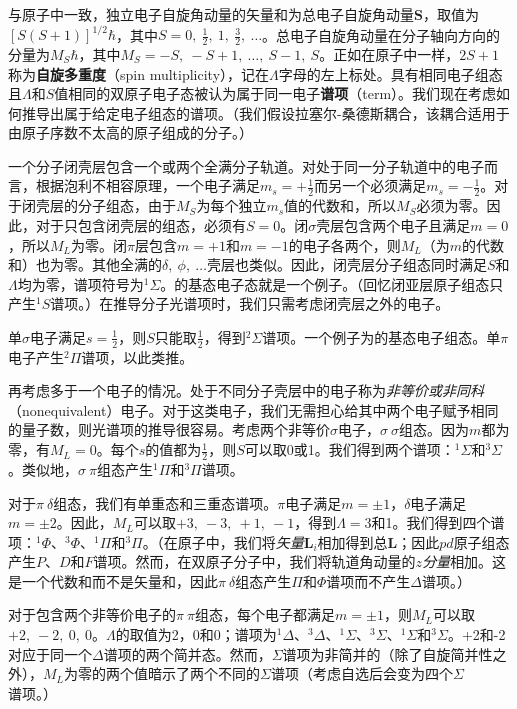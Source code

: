    与原子中一致，独立电子自旋角动量的矢量和为总电子自旋角动量$\mathbf{S}$，取值为$\left[S\left(S+1\right)\right]^{1/2}\hbar$，其中$S = 0,\:\frac{1}{2},\:1,\:\frac{3}{2},\:\ldots$。总电子自旋角动量在分子轴向方向的分量为$M_S\hbar$，其中$M_S = -S,\:-S+1,\:\ldots,\:S-1,\:S$。正如在原子中一样，$2S+1$称为\textbf{自旋多重度}（spin multiplicity），记在$\Lambda$字母的左上标处。具有相同电子组态且$\Lambda$和$S$值相同的双原子电子态被认为属于同一电子\textbf{谱项}（term）。我们现在考虑如何推导出属于给定电子组态的谱项。（我们假设拉塞尔-桑德斯耦合，该耦合适用于由原子序数不太高的原子组成的分子。）

    一个分子闭壳层包含一个或两个全满分子轨道。对处于同一分子轨道中的电子而言，根据泡利不相容原理，一个电子满足$m_s = +\frac{1}{2}$而另一个必须满足$m_s = -\frac{1}{2}$。对于闭壳层的分子组态，由于$M_S$为每个独立$m_s$值的代数和，所以$M_S$必须为零。因此，对于只包含闭壳层的组态，必须有$S=0$。闭$\sigma$壳层包含两个电子且满足$m=0$，所以$M_L$为零。闭$\pi$层包含$m=+1$和$m=-1$的电子各两个，则$M_L$（为$m$的代数和）也为零。其他全满的$\delta,\:\phi,\:\ldots$壳层也类似。因此，闭壳层分子组态同时满足$S$和$\Lambda$均为零，谱项符号为$^1\Sigma$。的基态电子态就是一个例子。（回忆闭亚层原子组态只产生$^1S$谱项。）在推导分子光谱项时，我们只需考虑闭壳层之外的电子。

    单$\sigma$电子满足$s = \frac{1}{2}$，则$S$只能取$\frac{1}{2}$，得到$^2\Sigma$谱项。一个例子为的基态电子组态。单$\pi$电子产生$^2\Pi$谱项，以此类推。

    再考虑多于一个电子的情况。处于不同分子壳层中的电子称为\textit{非等价或非同科}（nonequivalent）电子。对于这类电子，我们无需担心给其中两个电子赋予相同的量子数，则光谱项的推导很容易。考虑两个非等价$\sigma$电子，$\sigma\:\sigma$组态。因为$m$都为零，有$M_L = 0$。每个$s$的值都为$\frac{1}{2}$，则$S$可以取0或1。我们得到两个谱项：$^1\Sigma$和$^3\Sigma$。类似地，$\sigma\:\pi$组态产生$^1\Pi$和$^3\Pi$谱项。

    对于$\pi\:\delta$组态，我们有单重态和三重态谱项。$\pi$电子满足$m = \pm 1$，$\delta$电子满足$m = \pm 2$。因此，$M_L$可以取$+3,\:-3,\:+1,\:-1$，得到$\Lambda = 3$和1。我们得到四个谱项：$^1\Phi$、$^3\Phi$、$^1\Pi$和$^3\Pi$。（在原子中，我们将\textit{矢量}$\mathbf{L}_i$相加得到总$\mathbf{L}$；因此$pd$原子组态产生$P$、$D$和$F$谱项。然而，在双原子分子中，我们将轨道角动量的\textit{$z$分量}相加。这是一个代数和而不是矢量和，因此$\pi\:\delta$组态产生$\Pi$和$\Phi$谱项而不产生$\Delta$谱项。）

    对于包含两个非等价电子的$\pi\:\pi$组态，每个电子都满足$m = \pm 1$，则$M_L$可以取$+2,\:-2,\:0,\:0$。$\Lambda$的取值为2，0和0；谱项为$^1\Delta$、$^3\Delta$、$^1\Sigma$、$^3\Sigma$、$^1\Sigma$和$^3\Sigma$。+2和-2对应于同一个$\Delta$谱项的两个简并态。然而，$\Sigma$谱项为非简并的（除了自旋简并性之外），$M_L$为零的两个值暗示了两个不同的$\Sigma$谱项（考虑自选后会变为四个$\Sigma$谱项。）


